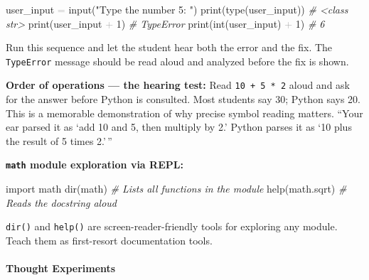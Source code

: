 \documentclass[
  justified,
  openright,
]{tufte-book}
\let\paragraph\paragraph
\newcommand{\StringTok}[1]{\textcolor{CodeString}{#1}}              %
\newcommand{\CommentTok}[1]{\textcolor{CodeComment}{\textit{#1}}}  %
\newcommand{\CodeNumTok}[1]{\textcolor{CodeNumber}{#1}}             %
\newcommand{\CodeAccentTok}[1]{\textcolor{CodeAccent}{#1}}          %
\newcommand{\OperatorTok}[1]{\textcolor{DarkGray}{#1}}              %
\newenvironment{Shaded}{%
  \begin{mdframed}[style=TufteCode]%
}{%
  \end{mdframed}%
}
\let\paragraph\paragraph
\begin{document}

\begin{Shaded}
\begin{Highlighting}[]
user\_input \OperatorTok{=} input(\StringTok{"Type the number 5: "})
print(type(user\_input))   \CommentTok{\# \textless{}class \textquotesingle{}str\textquotesingle{}\textgreater{}}
print(user\_input \OperatorTok{+} \CodeNumTok{1})      \CommentTok{\# TypeError}
print(int(user\_input) \OperatorTok{+} \CodeNumTok{1}) \CommentTok{\# 6}
\end{Highlighting}
\end{Shaded}

Run this sequence and let the student hear both the error and the fix.
The \texttt{TypeError} message should be read aloud and analyzed before
the fix is shown.

\textbf{Order of operations --- the hearing test:} Read
\texttt{10\ +\ 5\ *\ 2} aloud and ask for the answer before Python is
consulted. Most students say 30; Python says 20. This is a memorable
demonstration of why precise symbol reading matters. ``Your ear parsed
it as `add 10 and 5, then multiply by 2.' Python parses it as `10 plus
the result of 5 times 2.'\,''

\textbf{\texttt{math} module exploration via REPL:}

\begin{Shaded}
\begin{Highlighting}[]
\CodeAccentTok{import} math
dir(math)  \CommentTok{\# Lists all functions in the module}
help(math.sqrt)  \CommentTok{\# Reads the docstring aloud}
\end{Highlighting}
\end{Shaded}

\texttt{dir()} and \texttt{help()} are screen-reader-friendly tools for
exploring any module. Teach them as first-resort documentation tools.

\paragraph{Thought Experiments}\label{thought-experiments-8}
\end{document}
